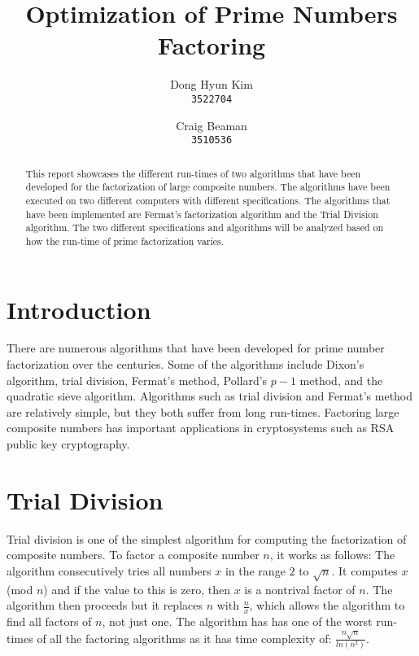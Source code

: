 \documentclass[]{article}
\title{Optimization of Prime Numbers Factoring}
\author{
	Dong Hyun Kim\\
\texttt{3522704}
\and
Craig Beaman\\
\texttt{3510536}}
\begin{document}
\maketitle

\begin{abstract}
This report showcases the different run-times of two algorithms that have been developed for the factorization of large composite numbers. The algorithms have been executed on two different computers with different specifications. The algorithms that have been implemented are Fermat's factorization algorithm and the Trial Division algorithm. The two different specifications and algorithms will be analyzed based on how the run-time of prime factorization varies.
\end{abstract}

\section{Introduction}
There are numerous algorithms that have been developed for prime number factorization over the centuries. Some of the algorithms include Dixon's algorithm, trial division, Fermat's method, Pollard's $p-1$ method, and the quadratic sieve algorithm. Algorithms such as trial division and Fermat's method are relatively simple, but they both suffer from long run-times. Factoring large composite numbers has important applications in cryptosystems such as RSA public key cryptography.

\section{Trial Division}
Trial division is one of the simplest algorithm for computing the factorization of composite numbers. To factor a composite number $n$, it works as follows: The algorithm consecutively tries all numbers $x$ in the range $2$ to $\sqrt{n}$. It computes $x$ (mod $n$) and if the value to this is zero, then $x$ is a nontrival factor of $n$. The algorithm then proceeds but it replaces $n$ with $\frac{n}{x}$, which allows the algorithm to find all factors of $n$, not just one. The algorithm has has one of the worst run-times of all the factoring algorithms as it has time complexity of: $\frac{n\sqrt{n}}{ln(n^2)}$.
\end{document}

